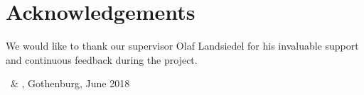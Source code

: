 \thispagestyle{plain}			%
\section*{Acknowledgements}
We would like to thank our supervisor Olaf Landsiedel for his invaluable support and continuous feedback during the project.

\vspace{1.5cm}
\hfill
\firstauthor\ \& \secondauthor, Gothenburg, June 2018

\newpage				%
\thispagestyle{empty}
\mbox{}